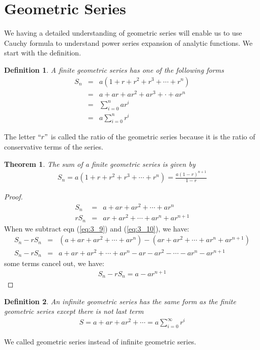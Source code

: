 \documentclass[12pt]{report}
\newcommand{\sps}{\\[0.2cm]}
\newcommand{\refn}[1]{(\ref{#1})}
\newcommand{\refx}[1]{\refn{eq:#1}}
\newtheorem{theorem}{Theorem}[chapter]
\newtheorem{definition}{Definition}[chapter]
\begin{document}
	\section{Geometric Series}
	We having a detailed understanding of geometric series will enable us to use Cauchy formula to understand power series expansion of analytic functions. We start with the definition.
	\begin{definition}
		A finite geometric series has one of the following forms
		\begin{eqnarray*}
			S_n &=& a(1+r+r^2+r^3+\cdots + r^n)\sps
			&=& a+ ar + ar^2 + ar^3 + \cdot + ar^n\sps
			&=& \sum_{i=0}^{n}ar^i\sps
			&=& a\sum_{i=0}^{n}r^i
		\end{eqnarray*}
	\end{definition}
	The letter $``r"$ is called the ratio of the geometric series because it is the ratio of conservative terms of the series.
	
	\begin{theorem}
		The sum of a finite geometric series is given by 
		\begin{eqnarray*}
			S_n = a(1+r+r^2+r^3+\cdots + r^n)= \frac{a(1-r)^{n+1}}{1-r}
		\end{eqnarray*}
	\end{theorem}
	\begin{proof}
		\begin{eqnarray}
			S_n &=& a+ar + ar^2 + \cdots + ar^n\sps \label{eq:3_9}
			rS_n &=& ar + ar^2 + \cdots + ar^n + ar^{n+1}\label{eq:3_10}
		\end{eqnarray}
		When we subtract eqn \refx{3_9} and \refx{3_10}, we have:
		\begin{eqnarray*}
			S_n - rS_n &=&(a+ar+ar^2+\cdots + ar^n) - (ar+ar^2+\cdots+ar^n+ar^{n+1})\sps
			S_n - rS_n &=& a + ar + ar^2 + \cdots + ar^n - ar - ar^2 - \cdots - ar^n - ar^{n+1}
		\end{eqnarray*}
		some terms cancel out, we have:
		\begin{eqnarray*}
			S_n - rS_n = a-ar^{n+1}
		\end{eqnarray*}
	\end{proof}
	
	\begin{definition}
		An infinite geometric series has the same form as the finite geometric series except there is not last term
		\begin{eqnarray*}
			S = a + ar + ar^2 + \cdots = a\sum_{i=0}^{\infty}r^i
		\end{eqnarray*}
	\end{definition}
	We called geometric series instead of infinite geometric series.
	
\end{document}
